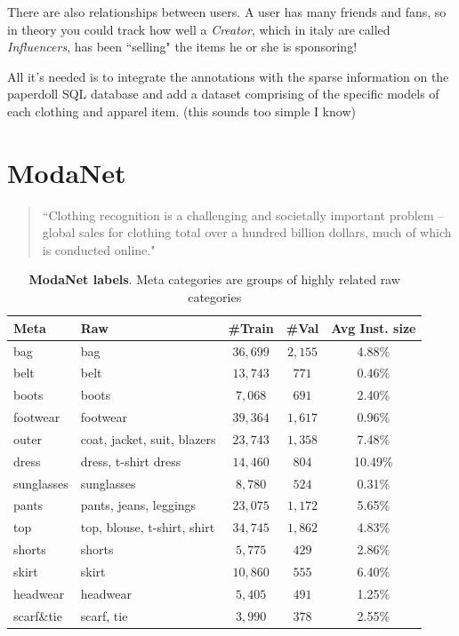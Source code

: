 
There are also relationships between users. A user has many friends and fans, so in theory you could track how well a \emph{Creator}, which in italy are called \emph{Influencers}, has been “selling" the items he or she is sponsoring!

All it's needed is to integrate the \modanet annotations with the sparse information on the paperdoll SQL database and add a dataset comprising of the specific models of each clothing and apparel item. (this sounds too simple I know)


\section{ModaNet}\label{s:ds-modanet}

\begin{quotation}
	“Clothing recognition is a challenging and societally important problem – global sales for clothing total over a hundred billion dollars, much of which is conducted online." \cite{yamaguchi2013paper}
\end{quotation}

\begin{table}[H]
\centering
\small
\caption{\textbf{ModaNet labels}. Meta categories are groups of highly related raw categories}
\label{t:modanet statistics}
\begin{tabularx}{\textwidth}{@{}lXccc@{}}
\hline
Meta & Raw & \#Train & \#Val & Avg Inst. size\\
\hline
bag  & bag & $36,699$  & $2,155$  & 4.88\% \\
belt  & belt & $13,743$ & $771$ & 0.46\% \\
boots  & boots & $7,068$ & $691$ & 2.40\%  \\
footwear  & footwear & $39,364$ & $1,617$ & 0.96\% \\
outer  & coat, jacket, suit, blazers
& $23,743$ & $1,358$ & 7.48\% \\
dress  & dress, t-shirt dress & $14,460$ & $804$ & 10.49\% \\
sunglasses  & sunglasses &  $8,780$ & $524$ & 0.31\% \\
pants  & pants, jeans, leggings & $23,075$  &  $1,172$ & 5.65\% \\
top  & top, blouse, t-shirt, shirt & $34,745$ & $1,862$ & 4.83\% \\ 
shorts  & shorts & $5,775$ & $429$ & 2.86\% \\ 
skirt  & skirt & $10,860$  & $555$ &  6.40\% \\ 
headwear  & headwear & $5,405$ & $491$ & 1.25\% \\ 
scarf\&tie  & scarf, tie & $3,990$ & $378$ & 2.55\%  \\ 
\hline
\end{tabularx}
\end{table}

